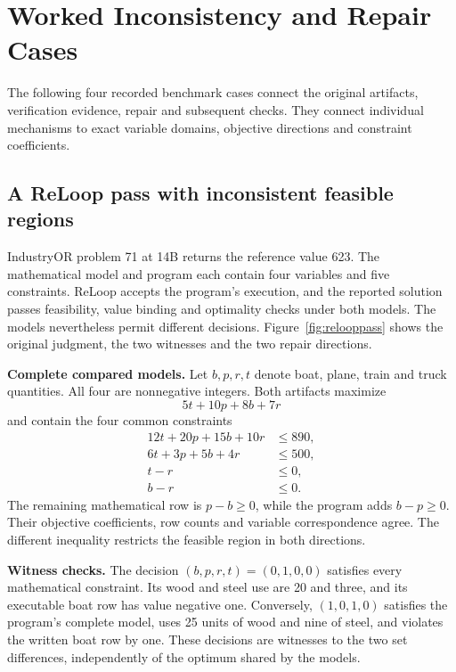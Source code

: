 \section{Worked Inconsistency and Repair Cases}\label{app:workedexamples}

The following four recorded benchmark cases connect the original artifacts, verification evidence,
repair and subsequent checks. They connect individual mechanisms to exact variable domains,
objective directions and constraint coefficients.

\subsection{A ReLoop pass with inconsistent feasible regions}
\label{app:industryexample}



IndustryOR problem 71 at 14B returns the reference value 623. The mathematical model and program
each contain four variables and five constraints. ReLoop accepts the program's execution, and the
reported solution passes feasibility, value binding and optimality checks under both models.
The models nevertheless permit different decisions. Figure~\ref{fig:relooppass} shows the original
judgment, the two witnesses and the two repair directions.

\textbf{Complete compared models.} Let \(b,p,r,t\) denote boat, plane, train and truck quantities.
All four are nonnegative integers. Both artifacts maximize
\begin{equation}
5t+10p+8b+7r
\label{eq:industryobjective}
\end{equation}
and contain the four common constraints
\begin{equation}
\begin{aligned}
12t+20p+15b+10r&\leq890,\\
6t+3p+5b+4r&\leq500,\\
t-r&\leq0,\\
b-r&\leq0.
\end{aligned}
\label{eq:industrycommon}
\end{equation}
The remaining mathematical row is \(p-b\geq0\), while the program adds \(b-p\geq0\).
Their objective coefficients, row counts and variable correspondence agree. The different
inequality restricts the feasible region in both directions.

\textbf{Witness checks.} The decision \((b,p,r,t)=(0,1,0,0)\) satisfies every mathematical
constraint. Its wood and steel use are 20 and three, and its executable boat row has value negative
one. Conversely, \((1,0,1,0)\) satisfies the program's complete model, uses 25 units of wood and nine
of steel, and violates the written boat row by one. These decisions are witnesses to the two
set differences, independently of the optimum shared by the models.

